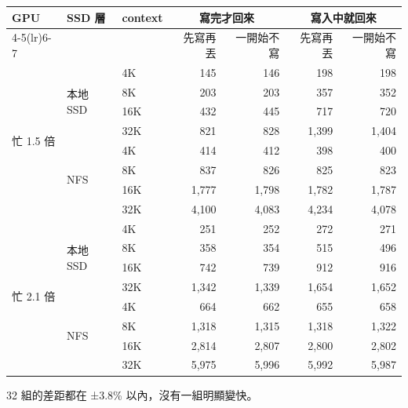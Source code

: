 \documentclass[11pt,a4paper]{article}
\newcommand{\note}[1]{{\footnotesize\color{black!70}#1}}
\begin{document}
\begin{center}
\renewcommand{\thetable}{A1}
\label{tab:a1}
\small
\begin{tabular}{lllrrrr}
\toprule
\multirow{2}{*}{GPU} & \multirow{2}{*}{SSD 層} & \multirow{2}{*}{context} & \multicolumn{2}{c}{寫完才回來} & \multicolumn{2}{c}{寫入中就回來} \\
\cmidrule(lr){4-5}\cmidrule(lr){6-7}
 & & & 先寫再丟 & 一開始不寫 & 先寫再丟 & 一開始不寫 \\
\midrule
\multirow{8}{*}{忙 1.5 倍} & \multirow{4}{*}{本地 SSD} & 4K & 145 & 146 & 198 & 198 \\
 & & 8K & 203 & 203 & 357 & 352 \\
 & & 16K & 432 & 445 & 717 & 720 \\
 & & 32K & 821 & 828 & 1,399 & 1,404 \\
\cmidrule(lr){2-7}
 & \multirow{4}{*}{NFS} & 4K & 414 & 412 & 398 & 400 \\
 & & 8K & 837 & 826 & 825 & 823 \\
 & & 16K & 1,777 & 1,798 & 1,782 & 1,787 \\
 & & 32K & 4,100 & 4,083 & 4,234 & 4,078 \\
\midrule
\multirow{8}{*}{忙 2.1 倍} & \multirow{4}{*}{本地 SSD} & 4K & 251 & 252 & 272 & 271 \\
 & & 8K & 358 & 354 & 515 & 496 \\
 & & 16K & 742 & 739 & 912 & 916 \\
 & & 32K & 1,342 & 1,339 & 1,654 & 1,652 \\
\cmidrule(lr){2-7}
 & \multirow{4}{*}{NFS} & 4K & 664 & 662 & 655 & 658 \\
 & & 8K & 1,318 & 1,315 & 1,318 & 1,322 \\
 & & 16K & 2,814 & 2,807 & 2,800 & 2,802 \\
 & & 32K & 5,975 & 5,996 & 5,992 & 5,987 \\
\bottomrule
\end{tabular}

\vspace{2pt}
\note{32 組的差距都在 ±3.8\% 以內，沒有一組明顯變快。}
\end{center}
\end{document}
